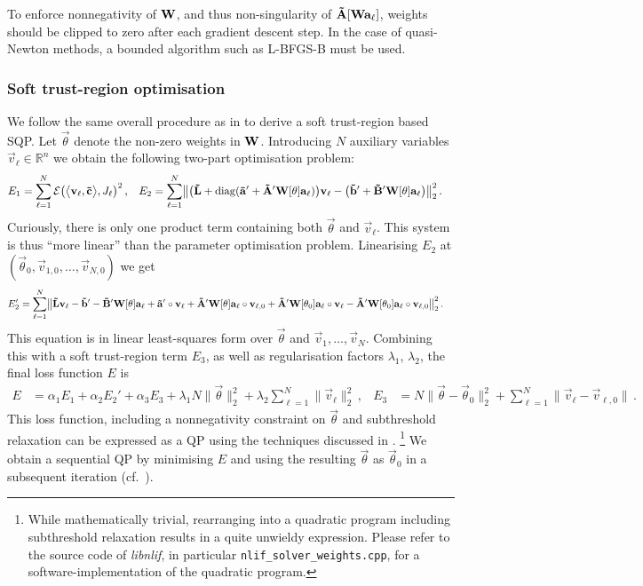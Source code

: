 To enforce nonnegativity of $\mathbf{W}$, and thus non-singularity of $\mathbf{\tilde A}[\mathbf{W} \mathbf{a}_\ell]$, weights should be clipped to zero after each gradient descent step.
In the case of quasi-Newton methods, a bounded algorithm such as L-BFGS-B must be used.

\subsubsection{Soft trust-region optimisation}
We follow the same overall procedure as in  to derive a soft trust-region based SQP.
Let $\vec \theta$ denote the non-zero weights in $\mathbf{W}$.
Introducing $N$ auxiliary variables $\vec v_\ell \in \mathbb{R}^n$ we obtain the following two-part optimisation problem:
\begin{align*}
	E_1 &= \sum_{\ell = 1}^N \mathcal{E}\bigl(
   	   	\bigl\langle
   	   		\mathbf{v}_\ell,
   	   		\mathbf{\tilde c}
   	   	\bigr\rangle, J_\ell \bigr)^2 \,, &
	E_2 &= \sum_{\ell = 1}^N  \bigl\|
		\bigl(\mathbf{\tilde L} + \operatorname{\mathrm{diag}}(\mathbf{\tilde a}' + \mathbf{\tilde A}' \mathbf{W}[\mathbf{\theta}] \mathbf{a}_\ell) \bigr) \mathbf{v}_\ell - \bigl(\mathbf{\tilde b}' + \mathbf{\tilde B}' \mathbf{W}[\mathbf{\theta}] \mathbf{a}_\ell \bigr) \bigr\|_2^2
	\,.
\end{align*}
Curiously, there is only one product term containing both $\vec \theta$ and $\vec v_\ell$.
This system is thus \enquote{more linear} than the parameter optimisation problem.
Linearising $E_2$ at $(\vec \theta_0, \vec v_{1, 0}, \ldots, \vec v_{N, 0})$ we get
\begin{align*}
	E_2' &= \sum_{\ell = 1}^N  \bigl\|
		  \mathbf{\tilde L} \mathbf{v}_\ell
		- \mathbf{\tilde b}'
		- \mathbf{\tilde B}' \mathbf{W}[\mathbf{\theta}] \mathbf{a}_\ell
		+ \mathbf{\tilde a}' \circ \mathbf{v}_\ell
		+ \mathbf{\tilde A}' \mathbf{W}[\mathbf{\theta}] \mathbf{a}_\ell \circ \mathbf{v}_{\ell, 0}
		+ \mathbf{\tilde A}' \mathbf{W}[\mathbf{\theta}_0] \mathbf{a}_\ell \circ \mathbf{v}_\ell
		- \mathbf{\tilde A}' \mathbf{W}[\mathbf{\theta}_0] \mathbf{a}_\ell \circ \mathbf{v}_{\ell, 0}
	\bigr\|_2^2 \,.
\end{align*}
This equation is in linear least-squares form over $\vec \theta$ and $\vec v_1, \ldots, \vec v_N$.
Combining this with a soft trust-region term $E_3$, as well as regularisation factors $\lambda_1$, $\lambda_2$, the final loss function $E$ is
\begin{align}
	E &= \alpha_1 E_1 + \alpha_2 E_2' + \alpha_3 E_3 + \lambda_1 N \|\vec \theta\|_2^2 + \lambda_2 \sum_{\ell = 1}^N \| \vec v_\ell \|_2^2 \,, &
	E_3 &= N \|\vec \theta - \vec \theta_0 \|_2^2 + \sum_{\ell = 1}^N \| \vec v_\ell - \vec v_{\ell, 0} \| \,.
	\label{eqn:nlif_weight_sqp}
\end{align}
This loss function, including a nonnegativity constraint on $\vec \theta$ and subthreshold relaxation can be expressed as a QP using the techniques discussed in .%
\footnote{While mathematically trivial, rearranging  into a quadratic program including subthreshold relaxation results in a quite unwieldy expression.
Please refer to the source code of \emph{libnlif}, in particular \texttt{nlif\_solver\_weights.cpp}, for a software-implementation of the quadratic program.}
We obtain a sequential QP by minimising $E$ and using the resulting $\vec \theta$ as $\vec \theta_0$ in a subsequent iteration (cf.~).

